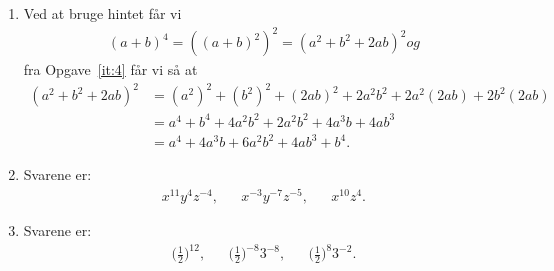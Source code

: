 \begin{enumerate}
\item Ved at bruge hintet får vi
\begin{align*}
(a+b)^4=((a+b)^2)^2=(a^2+b^2+2ab)^2 og
\end{align*}
fra Opgave~\ref{it:4} får vi så at
\begin{align*}
(a^2+b^2+2ab)^2&= (a^2)^2+(b^2)^2+(2ab)^2+2a^2b^2+2a^2(2ab)+2b^2(2ab)\\
&=a^4+b^4+4a^2b^2+2a^2b^2+4a^3b+4ab^3\\
&=a^4+4a^3b+6a^2b^2+4ab^3+b^4.
\end{align*}
\item Svarene er:
\begin{align*}
x^{11}y^{4}z^{-4},&& x^{-3}y^{-7}z^{-5},&& x^{10}z^4.
\end{align*}
\item Svarene er:
\begin{align*}
\Big( \frac{1}{2}\Big)^{12},&& \Big(\frac{1}{2}\Big)^{-8}3^{-8},&& \Big(\frac{1}{2}\Big)^{8}3^{-2}.
\end{align*}


\end{enumerate}
